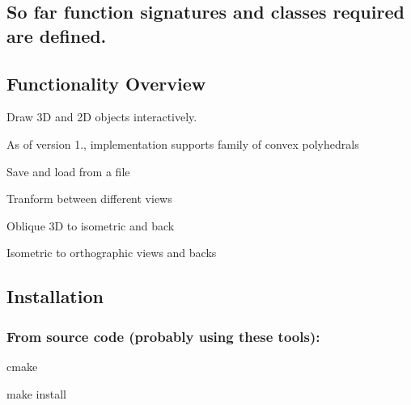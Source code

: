 \subsection*{So far function signatures and classes required are defined. }

\subsection*{Functionality Overview}


\begin{DoxyItemize}
\item Draw 3D and 2D objects interactively.
\item As of version 1., implementation supports family of convex polyhedrals
\item Save and load from a file
\item Tranform between different views
\item Oblique 3D to isometric and back
\item Isometric to orthographic views and backs
\end{DoxyItemize}

\subsection*{Installation}

\subsubsection*{From source code (probably using these tools)\+:}


\begin{DoxyItemize}
\item cmake
\item make install 
\end{DoxyItemize}